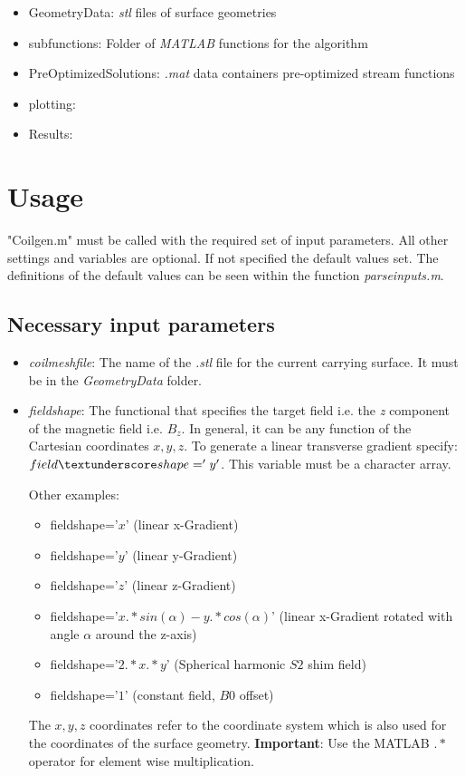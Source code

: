 \documentclass[a4paper,12pt]{book}
\begin{document}
\begin{itemize}
	\item  Geometry\textunderscore Data: \textit{stl} files of surface geometries
	\item  sub\textunderscore functions: Folder of \textit{MATLAB} functions for the algorithm
	\item  Pre\textunderscore Optimized\textunderscore Solutions: \textit{.mat} data containers pre-optimized stream functions  
	\item  plotting:
	\item  Results: 
	
\end{itemize}

\section{Usage}
"Coilgen.m" must be called with the required set of input parameters. All other settings and variables are optional. If not specified the default values set. The definitions of the default values can be seen within the function \textit{parse\textunderscore inputs.m}.

\subsection{Necessary input parameters}

\begin{itemize}
\item  \textit{coil\textunderscore mesh\textunderscore file}: The name of the \textit{.stl} file for the current carrying surface.  It must be in the\textit{ Geometry\textunderscore Data} folder.
\item  \textit{field\textunderscore shape}: The functional that specifies the target field i.e. the \textit{z} component of the magnetic field i.e. $B_{z}$. In general, it can be any function of the Cartesian coordinates $x,y,z$. To generate a linear transverse gradient specify: $field\textunderscore shape='y'$. This variable must be a character array. 

Other examples: 
\begin{itemize}
	\item  field\textunderscore shape='$x$' (linear x-Gradient)
	\item  field\textunderscore shape='$y$' (linear y-Gradient)
	\item  field\textunderscore shape='$z$' (linear z-Gradient)
	\item  field\textunderscore shape='$x.*sin(\alpha)-y.*cos(\alpha)$' (linear x-Gradient rotated with angle $\alpha$ around the z-axis)
	\item  field\textunderscore shape='$2.*x.*y$' (Spherical harmonic $S2$ shim field)
	\item  field\textunderscore shape='$1$' (constant field,  $B0$ offset)
\end{itemize}

The $x,y,z$ coordinates refer to the coordinate system which is also used for the coordinates of the surface geometry.
\textbf{Important}: Use the MATLAB $.*$ operator for element wise multiplication.

\end{itemize}
\end{document}
